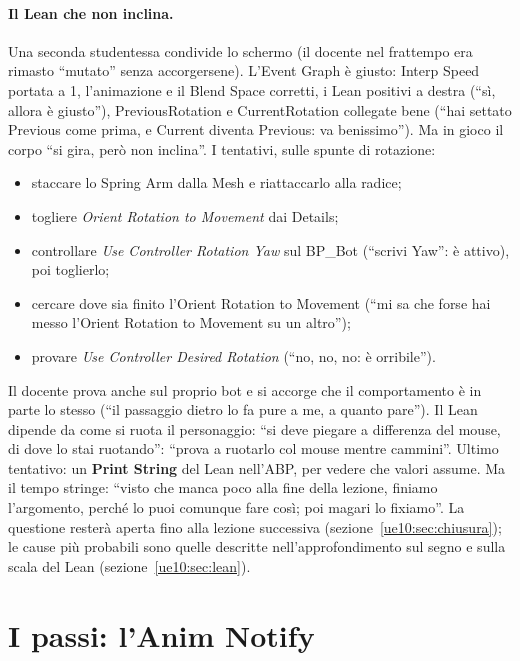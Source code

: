 \paragraph{Il Lean che non inclina.} Una seconda studentessa condivide lo schermo (il
docente nel frattempo era rimasto ``mutato'' senza accorgersene). L'Event Graph è giusto:
Interp Speed portata a 1, l'animazione e il Blend Space corretti, i Lean positivi a destra
(``sì, allora è giusto''), PreviousRotation e CurrentRotation collegate bene (``hai settato
Previous come prima, e Current diventa Previous: va benissimo''). Ma in gioco il corpo
``si gira, però non inclina''. I tentativi, sulle spunte di rotazione:
\begin{itemize}
  \item staccare lo Spring Arm dalla Mesh e riattaccarlo alla radice;
  \item togliere \emph{Orient Rotation to Movement} dai Details;
  \item controllare \emph{Use Controller Rotation Yaw} sul BP\_Bot (``scrivi Yaw'': è
        attivo), poi toglierlo;
  \item cercare dove sia finito l'Orient Rotation to Movement (``mi sa che forse hai messo
        l'Orient Rotation to Movement su un altro'');
  \item provare \emph{Use Controller Desired Rotation} (``no, no, no: è orribile'').
\end{itemize}
Il docente prova anche sul proprio bot e si accorge che il comportamento è in parte lo
stesso (``il passaggio dietro lo fa pure a me, a quanto pare''). Il Lean dipende da come
si ruota il personaggio: ``si deve piegare a differenza del mouse, di dove lo stai
ruotando'': ``prova a ruotarlo col mouse mentre cammini''. Ultimo tentativo: un
\textbf{Print String} del Lean nell'ABP, per vedere che valori assume. Ma il tempo
stringe: ``visto che manca poco alla fine della lezione, finiamo l'argomento, perché lo
puoi comunque fare così; poi magari lo fixiamo''. La questione resterà aperta fino alla
lezione successiva (sezione~\ref{ue10:sec:chiusura}); le cause più probabili sono quelle
descritte nell'approfondimento sul segno e sulla scala del Lean
(sezione~\ref{ue10:sec:lean}).

\section{I passi: l'Anim Notify}
\label{ue10:sec:notify}

